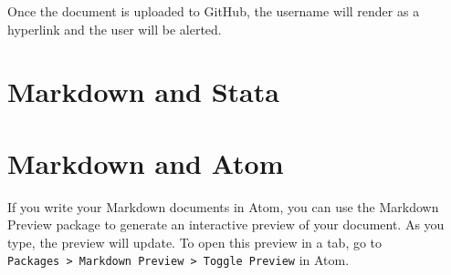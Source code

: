 \documentclass[]{book}
\theoremstyle{definition}
\theoremstyle{definition}
\theoremstyle{remark}
\begin{document}
Once the document is uploaded to GitHub, the username will render as a
hyperlink and the user will be alerted.

\section{Markdown and Stata}\label{markdown-and-stata}

\section{Markdown and Atom}\label{markdown-and-atom}

If you write your Markdown documents in Atom, you can use the Markdown
Preview package to generate an interactive preview of your document. As
you type, the preview will update. To open this preview in a tab, go to
\texttt{Packages\ \textgreater{}\ Markdown\ Preview\ \textgreater{}\ Toggle\ Preview}
in Atom.


\end{document}
